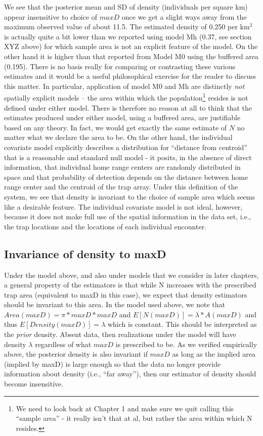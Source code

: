 We see that the posterior mean and SD of density (individuals per square km) appear insensitive to choice of $maxD$ once we get a slight ways away from the maximum observed value of about 11.5. The estimated density of 0.250 per km$^2$ is actually quite a bit lower than we reported using model Mh (0.37, see section XYZ above) for which sample area is not an explicit feature of the model. On the other hand it is higher than that reported from Model M0 using the buffered area (0.195). There is no basis really for comparing or contrasting these various estimates and it would be a useful philosophical exercise for the reader to discuss this matter. In particular, application of model M0 and Mh are distinctly {\it not} spatially explicit models -- the area within which the population\footnote{We need to look back at Chapter 1 and make sure we quit calling this ``sample area'' - it really isn't that at al, but rather the area within which N resides.} resides is not defined under either model. There is therefore no reason at all to think that the estimates produced under either model, using a buffered area, are justifiable based on any theory. In fact, we would get exactly the same estimate of $N$ no matter what we declare the area to be. On the other hand, the individual covariate model explicitly describes a distribution for ``distance from centroid'' that is a reasonable and standard null model - it posits, in the absence of direct information, that individual home range centers are randomly distributed in space and that probability of detection depends on the distance between home range center and the centroid of the trap array. Under this definition of the system, we see that density is invariant to the choice of sample area which seems like a desirable feature. The individual covariate model is not ideal, however, because it does not make full use of the spatial information in the data set, i.e., the trap locations and the locations of each individual encounter.


\subsection{Invariance of density to maxD}

Under the model above, and also under models that we consider in later chapters, a general property of the estimators is that while N increases with the prescribed trap area (equivalent to maxD in this case), we expect that density estimators should be invariant to this area. In the model used above, we note that
$Area(maxD) = \pi*maxD*maxD$ and $E[N(maxD)] = \lambda*A(maxD)$ and thus $E[Density(maxD)] = \lambda$  which is constant. This should be interpreted as the {\it prior} density. Absent data, then realizations under the model will have density $\lambda$ regardless of what $maxD$ is prescribed to be.  As we verified empirically above, the posterior density is also invariant if $maxD$ as long as the implied area (implied by maxD) is large enough so that the data no longer provide information about density (i.e., ``far away''), then our estimator of density should become insensitive.

